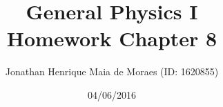 \title{General Physics I \\ Homework Chapter 8}
\author{Jonathan Henrique Maia de Moraes (ID: 1620855)}
\date{04/06/2016}
\maketitle
